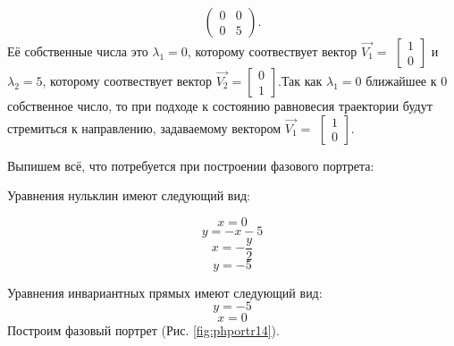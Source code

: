 \begin{itemize}
{		$$\begin{pmatrix}0 & 0\\0 & 5\end{pmatrix}. $$Её собственные числа это $\lambda_1=0$, которому соотвествует вектор $\Vec{V_1}=$ $\left[\begin{matrix}1\\0\end{matrix}\right]$ и $\lambda_2=5$, которому соотвествует вектор $\Vec{V_2}=$$\left[\begin{matrix}0\\1\end{matrix}\right]$.Так как $\lambda_1=0$ ближайшее к $0$ собственное число, то при подходе к состоянию равновесия траектории будут стремиться к направлению, задаваемому вектором $\Vec{V_1}=$ $\left[\begin{matrix}1\\0\end{matrix}\right]$.}
\end{itemize} 

Выпишем всё, что потребуется при построении фазового портрета:

Уравнения нульклин имеют следующий вид: 

$$x=0$$
$$y=- x - 5$$
$$x=- \frac{y}{2}$$
$$y=-5$$


Уравнения инвариантных прямых имеют следующий вид: 
$$y = -5$$
$$x = 0$$
Построим фазовый портрет (Рис. \ref{fig:phportr14}).

